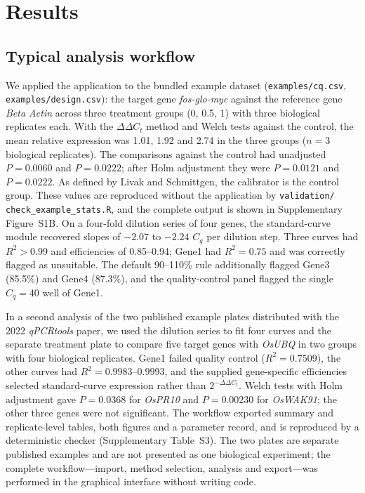 \section{Results}


\subsection{Typical analysis workflow}

{\sloppy We applied the application to the bundled example dataset
(\texttt{examples/cq.csv}, \texttt{examples/design.csv}): the target gene
\textit{fos-glo-myc} against the reference gene \textit{Beta Actin} across
three treatment groups (0, 0.5, 1) with three biological replicates each.
With the $\Delta\Delta C_t$ method and Welch tests against the control, the
mean relative expression was 1.01, 1.92 and 2.74 in the three groups
($n = 3$ biological replicates). The comparisons against the control had
unadjusted $P = 0.0060$ and $P = 0.0222$; after Holm adjustment
they were $P = 0.0121$ and $P = 0.0222$. As defined by Livak and Schmittgen,
the calibrator is the control group. These values are reproduced without the
application by \texttt{validation/}\allowbreak
\texttt{check\_example\_stats.R}, and the complete
output is shown in Supplementary Figure~S1B. On a four-fold dilution series
of four genes, the standard-curve module recovered slopes of $-2.07$ to
$-2.24$ $C_q$ per dilution step. Three curves had $R^2 > 0.99$ and
efficiencies of 0.85--0.94; Gene1 had $R^2 = 0.75$ and was correctly flagged
as unsuitable. The default 90--110\% rule additionally flagged Gene3 (85.5\%)
and Gene4 (87.3\%), and the quality-control panel flagged the single
$C_q = 40$ well of Gene1.

In a second analysis of the two published example plates distributed with the
2022 \textit{qPCRtools} paper, we used the dilution series to fit four curves
and the separate treatment plate to compare five target genes with
\textit{OsUBQ} in two groups with four biological replicates. Gene1 failed
quality control ($R^2 = 0.7509$), the other curves had
$R^2 = 0.9983$--$0.9993$, and the supplied gene-specific efficiencies
selected standard-curve expression rather than $2^{-\Delta\Delta C_t}$.
Welch tests with Holm adjustment gave $P = 0.0368$ for \textit{OsPR10} and
$P = 0.00230$ for \textit{OsWAK91}; the other three genes were not
significant. The workflow exported summary and replicate-level tables, both
figures and a parameter record, and is reproduced by a deterministic checker
(Supplementary Table~S3). The two plates are separate published examples and
are not presented as one biological experiment; the complete
workflow---import, method selection, analysis and export---was performed in
the graphical interface without writing code.\par}

